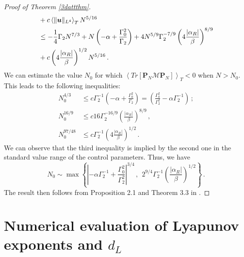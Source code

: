 \documentclass[11pt]{amsart}
\newcommand{\bu}{\mbox{\boldmath$u$}}
\newcommand{\Rb}{\beta}
\newcommand{\Gamzero}{\Gamma_{0}}
\newcommand{\Gamtwo}{\Gamma_{2}}
\theoremstyle{definition}
\numberwithin{equation}{section}
\numberwithin{equation}{section}
\begin{document}
\begin{proof}[Proof of Theorem \ref{3dattthm}]
\begin{align*}
&+ c \left\langle \lVert \bu \rVert_{L^4} \right\rangle_T N^{5/16} \\
&\leq - \frac{1}{4}\Gamtwo N^{7/3} + N \left(-\alpha+ \frac{\Gamzero^2}{\Gamtwo} \right) + 
4 N^{5/9} \Gamtwo^{-7/9}\left(4 \frac{|\alpha_{R}|}{\Rb}\right)^{8/9}\\ &+ c \left(4 \frac{|\alpha_{R}|}{\Rb}\right)^{1/2} N^{5/16}\,.
\end{align*}
We can estimate the value $N_{0}$ for which
$\left<Tr \left[ \mathbf{P}_{N}\mathcal{M}\mathbf{P}_{N}\right] \right>_{T} < 0$ when $N>N_{0}$.  This leads to the following inequalities:
\begin{align*}
N_0^{4/3} &\leq c \Gamtwo^{-1} \left(-\alpha + \frac{\Gamzero^2}{\Gamtwo} \right) =  \left(\frac{\Gamzero^2}{\Gamtwo^2}
-\alpha \Gamtwo^{-1}\right)\,; \\
N_0^{16/9} &\leq c 16\Gamtwo^{-16/9} \left(\frac{|\alpha_{R}|}{\Rb}\right)^{8/9}\,, \\
N_0^{97/48} & \leq c \Gamtwo^{-1} \left(4 \frac{|\alpha_{R}|}{\Rb}\right)^{1/2}\,. 
\end{align*}
We can observe that the third inequality is implied by the second one in the standard value range of the control parameters. Thus, we have 
\begin{equation}
N_{0} \sim \max \left\{\left\lvert- \alpha \Gamtwo^{-1} + \frac{\Gamzero^2}{\Gamtwo^2} \right\rvert^{3/4}\,,~~
2^{9/4}\Gamtwo^{-1}\left(\frac{|\alpha_{R}|}{\Rb}\right)^{1/2}\right\}\,.
\end{equation}
The result then follows from Proposition 2.1 and Theorem 3.3 in \cite[Chapter 5]{temam1997}.
\end{proof}

\section{\large Numerical evaluation of Lyapunov exponents and $d_L$}\label{Kiran}
\end{document}
